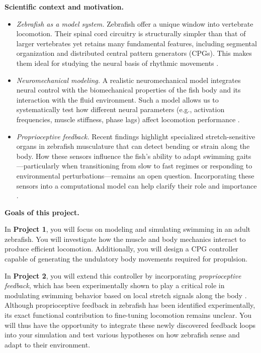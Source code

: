 \documentclass{cmc}
\begin{document}
\noindent
\textbf{Scientific context and motivation.}
\begin{itemize}
\item \emph{Zebrafish as a model system.} Zebrafish offer a unique window into vertebrate locomotion. Their spinal cord circuitry is structurally simpler than that of larger vertebrates yet retains many fundamental features, including segmental organization and distributed central pattern generators (CPGs). This makes them ideal for studying the neural basis of rhythmic movements \cite{grillner2019current}.
\item \emph{Neuromechanical modeling.} A realistic neuromechanical model integrates neural control with the biomechanical properties of the fish body and its interaction with the fluid environment. Such a model allows us to systematically test how different neural parameters (e.g., activation frequencies, muscle stiffness, phase lags) affect locomotion performance \cite{ramdya2023neuromechanics}.
\item \emph{Proprioceptive feedback.} Recent findings highlight specialized stretch-sensitive organs in zebrafish musculature that can detect bending or strain along the body. How these sensors influence the fish’s ability to adapt swimming gaits—particularly when transitioning from slow to fast regimes or responding to environmental perturbations—remains an open question. Incorporating these sensors into a computational model can help clarify their role and importance \cite{picton_spinal_2021}.
\end{itemize}

\noindent
\textbf{Goals of this project.}

In \textbf{Project 1}, you will focus on modeling and simulating swimming in an adult zebrafish.
You will investigate how the muscle and body mechanics interact to produce efficient locomotion.
Additionally, you will design a CPG controller capable of generating the undulatory body movements required for propulsion.

In \textbf{Project 2}, you will extend this controller by incorporating \emph{proprioceptive feedback}, which has been experimentally shown to play a critical role in modulating swimming behavior based on local stretch signals along the body \cite{picton_spinal_2021}. Although proprioceptive feedback in zebrafish has been identified experimentally, its exact functional contribution to fine-tuning locomotion remains unclear. You will thus have the opportunity to integrate these newly discovered feedback loops into your simulation and test various hypotheses on how zebrafish sense and adapt to their environment.
\end{document}
